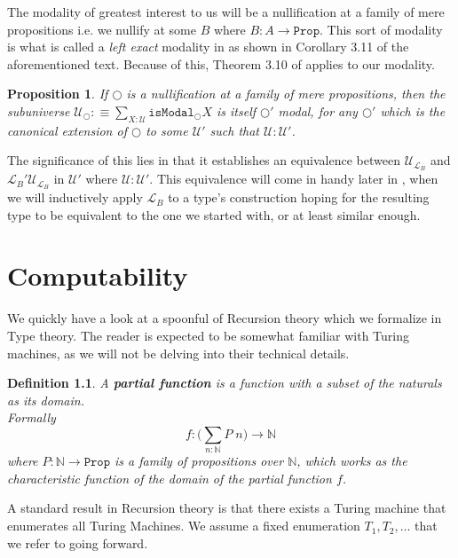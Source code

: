 \documentclass[12pt]{report}
\newtheorem{prop}[thm]{Proposition}
\newtheorem{defn}[thm]{Definition}
\theoremstyle{definition}
\begin{document}
The modality of greatest interest to us will be a nullification at a family of mere propositions i.e. we nullify at some $B$ where $B : A \rightarrow \mathtt{Prop}$. 
This sort of modality is what is called a \textit{left exact} modality in \cite{1706.07526} as shown in Corollary 3.11 of the aforementioned text. 
Because of this, Theorem 3.10 of \cite{1706.07526} applies to our modality. 
\begin{prop}
If $\bigcirc$ is a nullification at a family of mere propositions, then the subuniverse $\mathcal{U}_\bigcirc :\equiv \sum_{X : \mathcal{U}}\mathtt{isModal}_\bigcirc X$ is itself $\bigcirc'$ modal, for any $\bigcirc' $ which is the canonical extension of $\bigcirc$ to some $\mathcal{U}'$ such that $\mathcal{U} : \mathcal{U}'$. 
\end{prop}
The significance of this lies in that it establishes an equivalence between $\mathcal{U}_{\mathcal{L}_B}$ and $\mathcal{L}_B' \mathcal{U}_{\mathcal{L}_B}$ in $\mathcal{U}'$ where $\mathcal{U} : \mathcal{U}'$. 
This equivalence will come in handy later in , when we will inductively apply $\mathcal{L}_B$ to a type's construction hoping for the resulting type to be equivalent to the one we started with, or at least similar enough.

\chapter{Computability}\label{ChapterComputability}
We quickly have a look at a spoonful of Recursion theory which we formalize in Type theory. 
The reader is expected to be somewhat familiar with Turing machines, as we will not be delving into their technical details. 

\begin{defn}
A \textbf{partial function} is a function with a subset of the naturals as its domain.\\
Formally 
$$f : \Big(\sum_{n : \mathbb{N}} P\; n \Big) \rightarrow \mathbb{N}$$
where $P : \mathbb{N} \rightarrow \mathtt{Prop}$ is a family of propositions over $\mathbb{N}$, which works as the characteristic function of the domain of the partial function $f$.
\end{defn}

A standard result in Recursion theory is that there exists a Turing machine that enumerates all Turing Machines. 
We assume a fixed enumeration $T_1, T_2,\ldots $ that we refer to going forward. 
\end{document}
